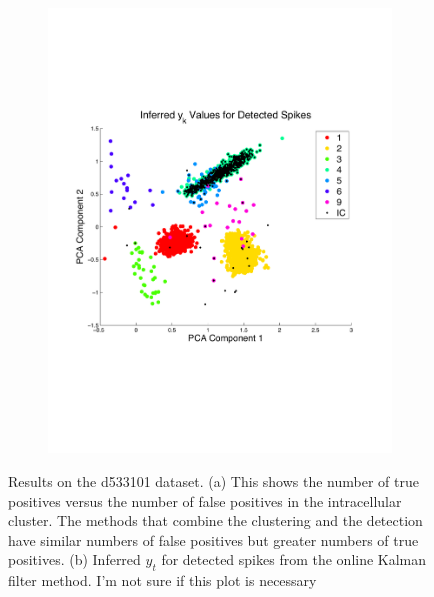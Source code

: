 \begin{center}
\begin{figure}
\begin{subfigure}[b]{.5\textwidth}
\includegraphics[width=\textwidth]{../figs/ykarreduced}
\caption{}
\label{pcaonlinear}
\end{subfigure}
\caption{Results on the d533101 dataset.  (a) This shows the number of true positives versus the number of false positives in the intracellular cluster.  The methods that combine the clustering and the detection have similar numbers of false positives but greater numbers of true positives.  (b) Inferred $y_t$ for detected spikes from the online Kalman filter method. {\color{red} I'm not sure if this plot is necessary}}
\end{figure}
\end{center}
